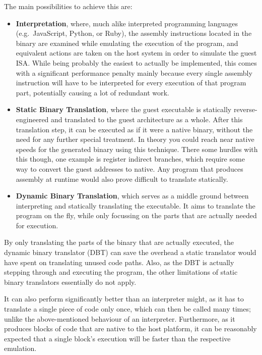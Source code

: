 The main possibilities to achieve this are:
\begin{itemize}
    \item \textbf{Interpretation}, where, much alike interpreted programming languages (e.g.\ JavaScript, Python, or Ruby), the assembly instructions located in the binary are examined while emulating the execution of the program, and equivalent actions are taken on the host system in order to simulate the guest ISA\@.
        \subitem While being probably the easiest to actually be implemented, this comes with a significant performance penalty mainly because every single assembly instruction will have to be interpreted for every execution of that program part, potentially causing a lot of redundant work.
    \item \textbf{Static Binary Translation}, where the guest executable is statically reverse-engineered and translated to the guest architecture as a whole.
    After this translation step, it can be executed as if it were a native binary, without the need for any further special treatment.
    In theory you could reach near native speeds for the generated binary using this technique.
    There some hurdles with this though, one example is register indirect branches, which require some way to convert the guest addresses to native.
    Any program that produces assembly at runtime would also prove difficult to translate statically.
    \item \textbf{Dynamic Binary Translation}, which serves as a middle ground between interpreting and statically translating the executable.
    It aims to translate the program on the fly, while only focussing on the parts that are actually needed for execution.
\end{itemize}

By only translating the parts of the binary that are actually executed, the dynamic binary translator (DBT) can save the overhead a static translator would have spent on translating unused code paths.
Also, as the DBT is actually stepping through and executing the program, the other limitations of static binary translators essentially do not apply.

It can also perform significantly better than an interpreter might, as it has to translate a single piece of code only once, which can then be called many times; unlike the above-mentioned behaviour of an interpreter.
Furthermore, as it produces blocks of code that are native to the host platform, it can be reasonably expected that a single block's execution will be faster than the respective emulation.

